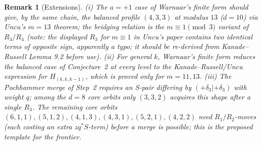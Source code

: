 \documentclass[11pt]{article}
\newtheorem{remark}[theorem]{Remark}
\begin{document}
\begin{remark}[Extensions]
(i) The $a=+1$ case of Warnaar's finite form should give, by the same
chain, the balanced profile $(4,3,3)$ at modulus $13$ ($d=10$) via Uncu's
$m=13$ theorem; the bridging relation is the $m\equiv1\pmod 3$ variant of
$R_3/R_4$ (note: the displayed $R_3$ for $m\equiv1$ in Uncu's paper contains
two identical terms of opposite sign, apparently a typo; it should be
re-derived from Kanade--Russell Lemma 9.2 before use).
(ii) For general $k$, Warnaar's finite form reduces the balanced case of
Conjecture~2 at every level to the Kanade--Russell/Uncu expression for
$H_{(k,k,k-1)}$, which is proved only for $m=11,13$.
(iii) The Pochhammer merge of Step~2 requires an S-pair differing by
$(+\delta_3|+\delta_3)$ with weight $q$; among the $d=8$ core orbits only
$(3,3,2)$ acquires this shape after a single $R_3$. The remaining core
orbits $(6,1,1),(5,1,2),(4,1,3),(4,3,1),(5,2,1),(4,2,2)$ need
$R_1/R_2$-moves (each costing an extra $zq^{\ast}S$-term) before a merge is
possible; this is the proposed template for the frontier.
\end{remark}
\end{document}
